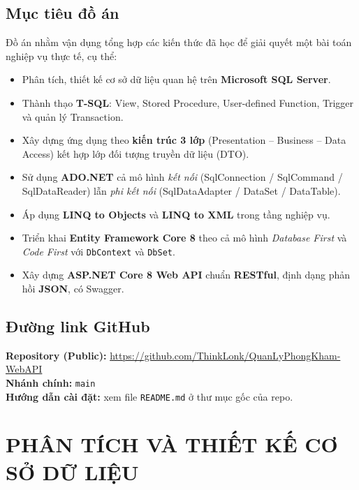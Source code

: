 \documentclass[12pt,a4paper]{report}
\begin{document}
\section{Mục tiêu đồ án}

Đồ án nhằm vận dụng tổng hợp các kiến thức đã học để giải quyết một bài toán nghiệp vụ thực tế, cụ thể:

\begin{itemize}[leftmargin=*]
\item Phân tích, thiết kế cơ sở dữ liệu quan hệ trên \textbf{Microsoft SQL Server}.
\item Thành thạo \textbf{T-SQL}: View, Stored Procedure, User-defined Function, Trigger và quản lý Transaction.
\item Xây dựng ứng dụng theo \textbf{kiến trúc 3 lớp} (Presentation -- Business -- Data Access) kết hợp lớp đối tượng truyền dữ liệu (DTO).
\item Sử dụng \textbf{ADO.NET} cả mô hình \emph{kết nối} (SqlConnection / SqlCommand / SqlDataReader) lẫn \emph{phi kết nối} (SqlDataAdapter / DataSet / DataTable).
\item Áp dụng \textbf{LINQ to Objects} và \textbf{LINQ to XML} trong tầng nghiệp vụ.
\item Triển khai \textbf{Entity Framework Core 8} theo cả mô hình \emph{Database First} và \emph{Code First} với \texttt{DbContext} và \texttt{DbSet}.
\item Xây dựng \textbf{ASP.NET Core 8 Web API} chuẩn \textbf{RESTful}, định dạng phản hồi \textbf{JSON}, có Swagger.
\end{itemize}

\section{Đường link GitHub}

\begin{tcolorbox}[colback=blue!5,colframe=blue!50!black,title=Mã nguồn dự án]
\textbf{Repository (Public):} \url{https://github.com/ThinkLonk/QuanLyPhongKham-WebAPI}\\
\textbf{Nhánh chính:} \texttt{main}\\
\textbf{Hướng dẫn cài đặt:} xem file \texttt{README.md} ở thư mục gốc của repo.
\end{tcolorbox}

\chapter{PHÂN TÍCH VÀ THIẾT KẾ CƠ SỞ DỮ LIỆU}
\end{document}

